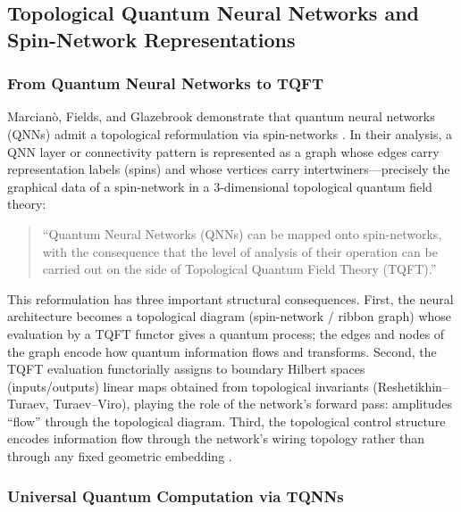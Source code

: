 \documentclass[
]{article}
\numberwithin{equation}{section}
\begin{document}
\subsection{Topological Quantum Neural Networks and Spin-Network
Representations}\label{topological-quantum-neural-networks-and-spin-network-representations}

\subsubsection{From Quantum Neural Networks to
TQFT}\label{from-quantum-neural-networks-to-tqft}

Marcianò, Fields, and Glazebrook demonstrate that quantum neural
networks (QNNs) admit a topological reformulation via spin-networks
\citep{fields2022tqnn}. In their analysis, a QNN layer or connectivity
pattern is represented as a graph whose edges carry representation
labels (spins) and whose vertices carry intertwiners---precisely the
graphical data of a spin-network in a 3-dimensional topological quantum
field theory:

\begin{quote}
``Quantum Neural Networks (QNNs) can be mapped onto spin-networks, with
the consequence that the level of analysis of their operation can be
carried out on the side of Topological Quantum Field Theory (TQFT).''
\citep{fields2022tqnn}
\end{quote}

This reformulation has three important structural consequences. First,
the neural architecture becomes a topological diagram (spin-network /
ribbon graph) whose evaluation by a TQFT functor gives a quantum
process; the edges and nodes of the graph encode how quantum information
flows and transforms. Second, the TQFT evaluation functorially assigns
to boundary Hilbert spaces (inputs/outputs) linear maps obtained from
topological invariants (Reshetikhin--Turaev, Turaev--Viro), playing the
role of the network's forward pass: amplitudes ``flow'' through the
topological diagram. Third, the topological control structure encodes
information flow through the network's wiring topology rather than
through any fixed geometric embedding \citep{fields2023tensor}.

\subsubsection{Universal Quantum Computation via
TQNNs}\label{universal-quantum-computation-via-tqnns}
\end{document}
